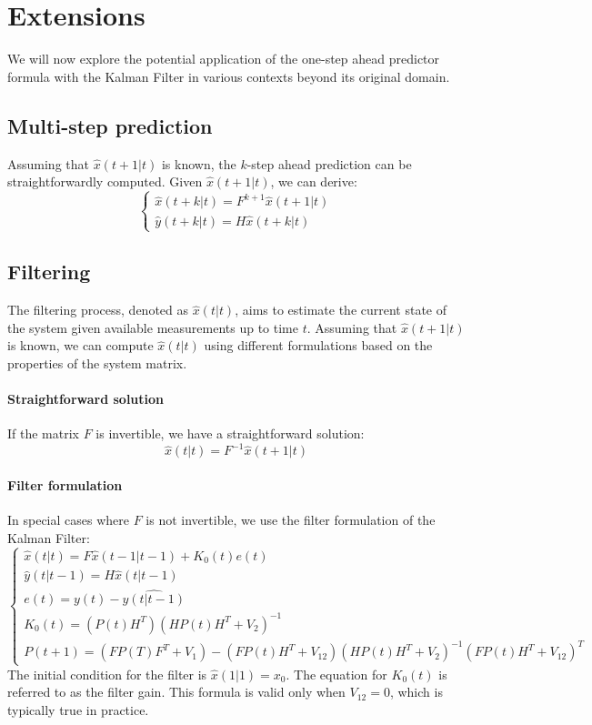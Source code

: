 \section{Extensions}

We will now explore the potential application of the one-step ahead predictor formula with the Kalman Filter in various contexts beyond its original domain.

\subsection{Multi-step prediction}
Assuming that $\hat{x}(t+1|t)$ is known, the $k$-step ahead prediction can be straightforwardly computed. 
Given $\hat{x}(t+1|t)$, we can derive:
\[\begin{cases}
    \hat{x}(t+k|t)=F^{k+1} \hat{x}(t+1|t) \\
    \hat{y}(t+k|t)=H \hat{x}(t+k|t)
\end{cases}\]

\subsection{Filtering}
The filtering process, denoted as $\hat{x}(t|t)$, aims to estimate the current state of the system given available measurements up to time $t$. 
Assuming that $\hat{x}(t+1|t)$ is known, we can compute $\hat{x}(t|t)$ using different formulations based on the properties of the system matrix.

\paragraph*{Straightforward solution}
If the matrix $F$ is invertible, we have a straightforward solution:
\[\hat{x}(t|t)=F^{-1} \hat{x}(t+1|t)\]

\paragraph*{Filter formulation}
In special cases where $F$ is not invertible, we use the filter formulation of the Kalman Filter:
\[\begin{cases}
    \hat{x}(t|t)=F\hat{x}(t-1|t-1)+K_0(t)e(t) \\
    \hat{y}(t|t-1)=H\hat{x}(t|t-1) \\
    e(t)=y(t)-\hat{y(t|t-1)} \\
    K_0(t)=\left(P(t)H^T\right)\left(HP(t)H^T+V_2\right)^{-1} \\
    P(t+1)=\left(FP(T)F^T+V_1\right)-\left(FP(t)H^T+V_{12}\right)\left(HP(t)H^T+V_{2}\right)^{-1}\left(FP(t)H^T+V_{12}\right)^T
\end{cases}\]
The initial condition for the filter is $\hat{x}(1|1)=x_0$. 
The equation for $K_0(t)$ is referred to as the filter gain.
This formula is valid only when $V_{12}=0$, which is typically true in practice.

